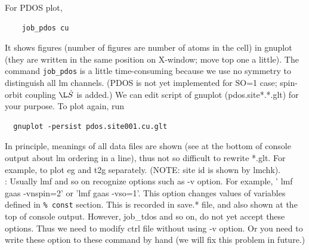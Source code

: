 For PDOS plot,
\begin{verbatim}
    job_pdos cu
\end{verbatim}
It shows figures (number of figures are number of atoms in the cell) in
gnuplot (they are written in the same position on X-window;
move top one a little). The command \verb+job_pdos+ is a little 
time-consuming because we use no symmetry to distinguish all lm channels.
(PDOS is not yet implemented for SO=1 case; spin-orbit coupling $\L\dot S$ is added.)
We can edit script of gnuplot (pdos.site*.*.glt) for your purpose.
To plot again, run
\begin{verbatim}
  gnuplot -persist pdos.site001.cu.glt
\end{verbatim}
In principle, meanings of all data files are shown (see at the bottom
of console output about lm ordering in a line), thus not so difficult to
rewrite *.glt. For example, to plot eg and t2g separately. 
(NOTE: site id is shown by lmchk).\\

: 
Usually lmf and so on recognize options such as -v option. For example,
' lmf gaas -vnspin=2' or 'lmf gaas -vso=1'. 
This option changes values of variables defined in \verb+% const+ section.
This is recorded in save.* file, and also shown at the top of console output. 
However, job\_tdos and so on, do not yet accept these options.
Thus we need to modify ctrl file without using -v option.
Or you need to write these option to these command by hand
(we will fix this problem in future.)



